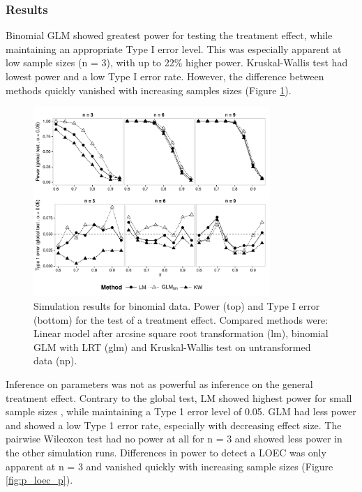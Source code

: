 \documentclass{scrartcl}
\begin{document}
\subsubsection{Results}
Binomial GLM showed greatest power for testing the treatment effect, while maintaining an appropriate Type I error level.
This was especially apparent at low sample sizes (n = 3), with up to 22\% higher power.
Kruskal-Wallis test had lowest power and a low Type I error rate.
However, the difference between methods quickly vanished with increasing samples sizes (Figure \ref{fig:p_glob_p}).

\begin{figure}[h]
  \centering
  \includegraphics[width = 0.8\textwidth]{p_glob_p.pdf}
  \caption{Simulation results for binomial data. Power (top) and Type I error (bottom) for the test of a treatment effect. Compared methods were: Linear model after arcsine square root transformation (lm), binomial GLM with LRT (glm) and Kruskal-Wallis test on untransformed data (np).}
  \label{fig:p_glob_p}
\end{figure}

Inference on parameters was not as powerful as inference on the general treatment effect.
Contrary to the global test, LM showed highest power for small sample sizes , while maintaining a Type 1 error level of 0.05.
GLM had less power and showed a low Type 1 error rate, especially with decreasing effect size.
The pairwise Wilcoxon test had no power at all for n = 3 and showed less power in the other simulation runs.
Differences in power to detect a LOEC was only apparent at n = 3 and vanished quickly with increasing sample sizes (Figure \ref{fig:p_loec_p}). 
\end{document}
